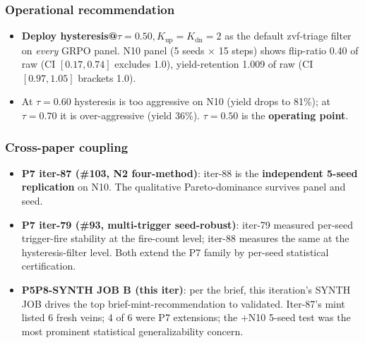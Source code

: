 \subsubsection{Operational recommendation}
\begin{itemize}
\item \textbf{Deploy hysteresis@$\tau{=}0.50, K_\text{up}{=}K_\text{dn}{=}2$}
      as the default zvf-triage filter on \emph{every} GRPO panel.
      N10 panel (5 seeds × 15 steps) shows flip-ratio 0.40 of raw
      (CI $[0.17, 0.74]$ excludes 1.0), yield-retention 1.009 of raw
      (CI $[0.97, 1.05]$ brackets 1.0).
\item At $\tau = 0.60$ hysteresis is too aggressive on N10 (yield drops
      to 81\%); at $\tau = 0.70$ it is over-aggressive (yield 36\%).
      $\tau = 0.50$ is the \textbf{operating point}.
\end{itemize}

\subsubsection{Cross-paper coupling}
\begin{itemize}
\item \textbf{P7 iter-87 (\#103, N2 four-method)}: iter-88 is the
      \textbf{independent 5-seed replication} on N10. The
      qualitative Pareto-dominance survives panel and seed.
\item \textbf{P7 iter-79 (\#93, multi-trigger seed-robust)}: iter-79
      measured per-seed trigger-fire stability at the fire-count level;
      iter-88 measures the same at the hysteresis-filter level. Both
      extend the P7 family by per-seed statistical certification.
\item \textbf{P5P8-SYNTH JOB B (this iter)}: per the brief, this
      iteration's SYNTH JOB drives the top brief-mint-recommendation
      to validated. Iter-87's mint listed 6 fresh veins; 4 of 6 were P7
      extensions; the +N10 5-seed test was the most prominent statistical
      generalizability concern.
\end{itemize}

